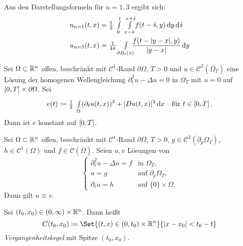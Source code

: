 \documentclass{cheat-sheet}
\begin{document}
\begin{bem}
  Aus den Darstellungsformeln für $n=1,3$ ergibt sich:
  \begin{align*}
    u_{n=1}(t, x) &= \tfrac{1}{2} \enspace \Int{0}{t}{\enspace \Int{x - \tilde{s}}{x + \tilde{s}}{f(t - \tilde{s}, y)}{y}}{\tilde{s}} \\
    u_{n=3}(t, x) &= \tfrac{1}{4 \pi} \quad \Int{\mathclap{\partial B_t(x)}}{}{\enspace \frac{f(t - \abs{y-x}, y)}{\abs{y-x}}}{y}
  \end{align*}
\end{bem}



\begin{lem}
  Sei $\Omega \subset \mathbb{R}^n$ offen, beschränkt mit $\mathcal{C}^1$-Rand $\partial \Omega$, $T > 0$ und $u \in \mathcal{C}^2(\overline{\Omega_T})$ eine Lösung der homogenen Wellengleichung $\partial_t^2 u - \Delta u = 0$ in $\Omega_T$ mit $u = 0$ auf $\left[ 0, T \right] \times \partial \Omega$. Sei
  \[
    e(t) \coloneqq \tfrac{1}{2} \enspace {\textstyle \int\limits_{\Omega}^{}} (\partial_t u(t,x))^2 + \lvert D u(t,x)\rvert^2 \,\mathrm{d} x \quad \text{für } t \in \left[ 0, T \right].
  \]
  Dann ist $e$ konstant auf $\left[ 0, T \right]$.
\end{lem}

\begin{satz}
  Sei $\Omega \subset \mathbb{R}^n$ offen, beschränkt mit $\mathcal{C}^1$-Rand $\partial \Omega$, $T > 0$, $g \in \mathcal{C}^2(\partial_p \Omega_T)$, $h \in \mathcal{C}^1(\Omega)$ und $f \in \mathcal{C}(\overline{\Omega})$. Seien $u, v$ Lösungen von
  \[
    \left\{ \begin{array}{ll}
      \partial_t^2 u - \Delta u = f & \text{in } \Omega_T, \\
      u = g & \text{auf } \partial_p \Omega_T, \\
      \partial_t u = h & \text{auf } \{ 0 \} \times \Omega.
    \end{array} \right.
  \]
  Dann gilt $u \equiv v$.
\end{satz}

\begin{defn}
  Sei $(t_0, x_0) \in \left( 0, \infty \right) \times \mathbb{R}^n$. Dann heißt
  \[
    C(t_0, x_0) \coloneqq \Set{(t, x) \in \ointerval{0}{t_0} \times \R^n}{ \abs{x-x_0} < t_0 - t }
  \]
  \emph{Vergangenheitskegel} mit Spitze $(t_0, x_0)$.
\end{defn}
\end{document}
